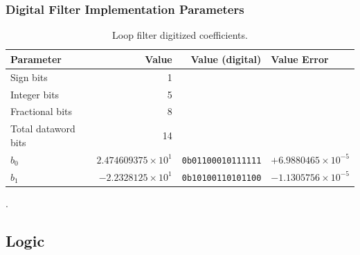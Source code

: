 		\subsubsection{Digital Filter Implementation Parameters}
		\begin{table}[h!]
			\centering
			\def\arraystretch{1.5}		
			\setlength\arrayrulewidth{0.75pt}
			\setlength{\tabcolsep}{1em} %
			\begin{tabular}{|l|r|r|l|}
				\hline 
				\rule[-1ex]{0pt}{2.5ex} \cellcolor{gray!40}\textbf{Parameter} & \cellcolor{gray!40}\textbf{Value} & \cellcolor{gray!40}\textbf{Value (digital) } & \cellcolor{gray!40}\textbf{Value Error}\\ 
				\hline 
				\rule[-1ex]{0pt}{2.5ex} Sign bits & 1 & & \\ 
				\hline 
				\rule[-1ex]{0pt}{2.5ex} Integer bits & 5 & & \\ 
				\hline 
				\rule[-1ex]{0pt}{2.5ex} Fractional bits & 8 & & \\ 
				\hline 
				\rule[-1ex]{0pt}{2.5ex} Total dataword bits & 14 & & \\ 
				\hline 
				\rule[-1ex]{0pt}{2.5ex} \textbf{$b_0$}  & $2.474609375\times10^1$ & \texttt{0b01100010111111}  & $+6.9880465\times10^{-5}$\\ 
				\hline 
				\rule[-1ex]{0pt}{2.5ex} \textbf{$b_1$}  & $-2.2328125\times10^1$ & \texttt{0b10100110101100}  & $-1.1305756\times10^{-5}$\\
				\hline 

			\end{tabular} 
			\caption{Loop filter digitized coefficients.}
			\label{dig_filter_params_fast}
		\end{table}  

{\color{white}.}
\FloatBarrier\pagebreak
\subsection{Logic}

